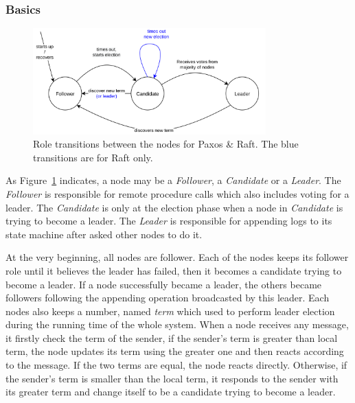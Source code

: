 \documentclass[12pt, a4paper]{article}
\begin{document}
\subsubsection{Basics}
\begin{figure}[htp]
\begin{center}
  \centering
  \includegraphics[width=0.8\textwidth]{img/roles-transitions.png}
  \caption{Role transitions between the nodes for Paxos \& Raft. The blue transitions are for Raft only.}
  \label{fig:roles-transitions}
\end{center}
\end{figure}
As Figure~\ref{fig:roles-transitions} indicates, a node may be a \textit{Follower},
a \textit{Candidate} or a \textit{Leader}.
The \textit{Follower} is responsible for
remote procedure calls which also includes voting for a leader.
The \textit{Candidate} is only at the election phase when a node in \textit{Candidate}
is trying to become a leader.
The \textit{Leader} is responsible for appending logs to its state machine after
asked other nodes to do it.

At the very beginning, all nodes are follower. Each of the nodes keeps its follower role
until it believes the leader has failed, then it becomes a candidate trying to become
a leader. If a node successfully became a leader, the others became followers following
the appending operation broadcasted by this leader.
Each nodes also keeps a number, named \textit{term} which used to perform leader election
during the running time of the whole system. When a node receives any message,
it firstly check the term of the sender, if the sender's term is greater than local term,
the node updates its term using the greater one and then reacts according to the message.
If the two terms are equal, the node reacts directly. Otherwise, if the sender's term
is smaller than the local term, it responds to the sender with its greater term and change
itself to be a candidate trying to become a leader.
\end{document}
